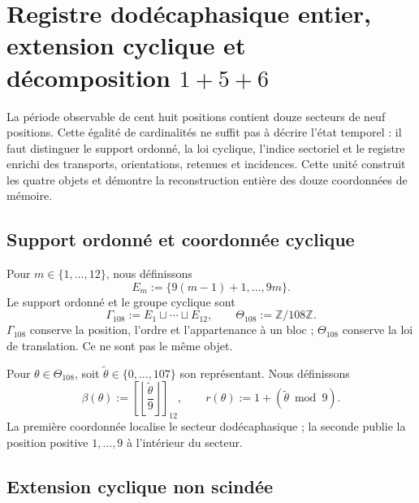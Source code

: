 {%

\section{Registre dodécaphasique entier, extension cyclique et décomposition \texorpdfstring{\(1+5+6\)}{1+5+6}}
\label{p12-83-c1-s9:chap:registro-dodecafasico-integral}

La période observable de cent huit positions contient douze secteurs de
neuf positions. Cette égalité de cardinalités ne suffit pas à décrire
l’état temporel : il faut distinguer le support ordonné, la loi cyclique,
l’indice sectoriel et le registre enrichi des transports, orientations,
retenues et incidences. Cette unité construit les quatre objets et démontre
la reconstruction entière des douze coordonnées de mémoire.

\subsection{Support ordonné et coordonnée cyclique}

Pour \(m\in\{1,\ldots,12\}\), nous définissons
\begin{equation}
 E_m:=\{9(m-1)+1,\ldots,9m\}.
 \label{p12-83-c1-s9:eq:u006d-bloques-nonadicos}
\end{equation}
Le support ordonné et le groupe cyclique sont
\begin{equation}
 \Gamma_{108}:=
 E_1\sqcup\cdots\sqcup E_{12},
 \qquad
 \Theta_{108}:=\mathbb Z/108\mathbb Z.
 \label{p12-83-c1-s9:eq:u006d-gamma-theta}
\end{equation}
\(\Gamma_{108}\) conserve la position, l’ordre et l’appartenance à un bloc ;
\(\Theta_{108}\) conserve la loi de translation. Ce ne sont pas le même objet.

Pour \(\theta\in\Theta_{108}\), soit
\(\widetilde\theta\in\{0,\ldots,107\}\) son représentant. Nous définissons
\begin{equation}
 \beta(\theta):=
 \left[
 \left\lfloor\frac{\widetilde\theta}{9}\right\rfloor
 \right]_{12},
 \qquad
 r(\theta):=1+(\widetilde\theta\bmod9).
 \label{p12-83-c1-s9:eq:u006d-coordenadas-bloque-residuo}
\end{equation}
La première coordonnée localise le secteur dodécaphasique ; la seconde publie
la position positive \(1,\ldots,9\) à l’intérieur du secteur.

\subsection{Extension cyclique non scindée}

}
